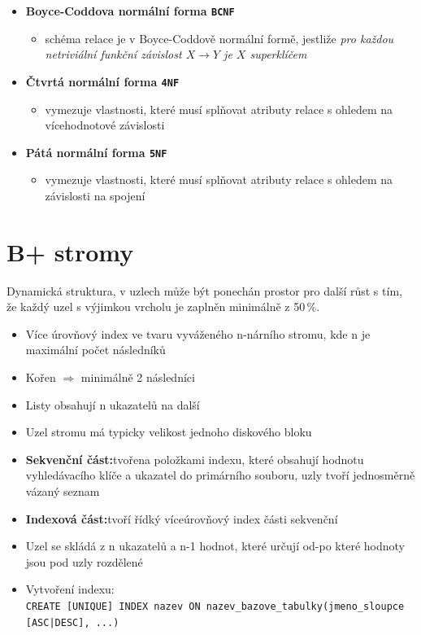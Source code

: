 \documentclass[a4paper,10pt]{article}
\newcommand{\pojem}[2]{\item \textbf{#1:}\quad #2}
\newcommand{\tedy}{$\Rightarrow$ }
\begin{document}
\begin{itemize}
				\item \textbf{Boyce-Coddova normální forma \texttt{BCNF}}
				\begin{itemize}
					\item schéma relace je v Boyce-Coddově normální formě, jestliže \emph{pro každou netriviální funkční závislost $X \rightarrow Y$ je $X$ superklíčem}
				\end{itemize}

				\item \textbf{Čtvrtá normální forma \texttt{4NF}}
				\begin{itemize}
					\item vymezuje vlastnosti, které musí splňovat atributy relace s ohledem na vícehodnotové závislosti
				\end{itemize}

				\item \textbf{Pátá normální forma \texttt{5NF}}
				\begin{itemize}
					\item vymezuje vlastnosti, které musí splňovat atributy relace s ohledem na závislosti na spojení
				\end{itemize}
			\end{itemize}

	\section{B+ stromy}
	Dynamická struktura, v uzlech může být ponechán prostor pro další růst s tím, že každý uzel s výjimkou vrcholu je zaplněn minimálně z 50\,\%.
	\begin{itemize}
		\item Více úrovňový index ve tvaru vyváženého n-nárního stromu, kde n je maximální počet následníků
		\item Kořen \tedy minimálně 2 následníci
		\item Listy obsahují n ukazatelů na další
		\item Uzel stromu má typicky velikost jednoho diskového bloku
		\pojem{Sekvenční část}{tvořena položkami indexu, které obsahují hodnotu vyhledávacího klíče a ukazatel do primárního souboru, uzly tvoří jednosměrně vázaný seznam}
		\pojem{Indexová část}{tvoří řídký víceúrovňový index části sekvenční}
		\item Uzel se skládá z n ukazatelů a n-1 hodnot, které určují od-po které hodnoty jsou pod uzly rozdělené
		\item Vytvoření indexu: \\ \texttt{CREATE [UNIQUE] INDEX nazev ON nazev\_bazove\_tabulky(jmeno\_sloupce [ASC|DESC], ...)}
	\end{itemize}
\end{document}
